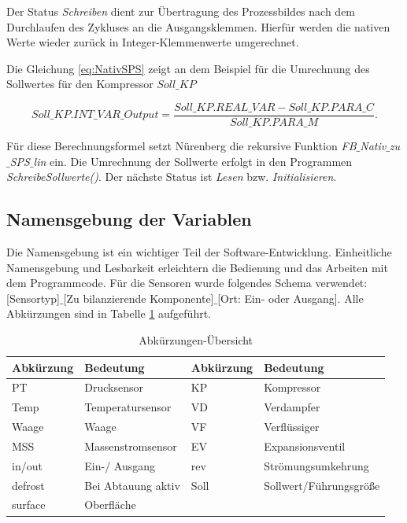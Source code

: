 Der Status \textit{Schreiben} dient zur Übertragung des Prozessbildes  nach dem Durchlaufen des Zykluses an die Ausgangsklemmen. Hierfür werden die nativen Werte wieder zurück in Integer-Klemmenwerte umgerechnet.

Die Gleichung \ref{eq:NativSPS} zeigt an dem Beispiel für die Umrechnung des Sollwertes für den Kompressor $Soll\_KP$

\begin{equation}
Soll\_KP.INT\_VAR\_Output = \frac{Soll\_KP.REAL\_VAR - Soll\_KP.PARA\_C}{Soll\_KP.PARA\_M}.
\label{eq:NativSPS} 
\end{equation}

Für diese Berechnungsformel setzt Nürenberg \citep{Nuerenberg2015} die rekursive Funktion \textit{FB$\_$Nativ$\_$zu$\_$SPS$\_$lin} ein. Die Umrechnung der Sollwerte erfolgt in den Programmen \textit{SchreibeSollwerte()}. Der nächste Status ist \textit{Lesen} bzw. \textit{Initialisieren}.

\subsection{Namensgebung der Variablen}
\label{subsec: Namensgebung}

Die Namensgebung ist ein wichtiger Teil der Software-Entwicklung. Einheitliche Namensgebung und Lesbarkeit erleichtern die Bedienung und das Arbeiten mit dem Programmcode. Für die Sensoren  wurde folgendes Schema verwendet: [Sensortyp]$\_$[Zu bilanzierende Komponente]$\_$[Ort: Ein- oder Ausgang]. Alle Abkürzungen sind in Tabelle \ref{tab:Abkürzungen} aufgeführt. 


\begin{table}[htb]
\centering
\caption{Abkürzungen-Übersicht}\vspace{6pt}
\begin{tabular}{llll}
\hline 
\rule[-1ex]{0pt}{2.5ex} \textbf{Abkürzung} & \textbf{Bedeutung} & \textbf{Abkürzung} & \textbf{Bedeutung} \\ 
\hline 
\hline
\rule[-1ex]{0pt}{2.5ex} PT & Drucksensor & KP & Kompressor \\ 
\hline 
\rule[-1ex]{0pt}{2.5ex} Temp & Temperatursensor & VD & Verdampfer \\ 
\hline 
\rule[-1ex]{0pt}{2.5ex} Waage & Waage & VF & Verflüssiger \\ 
\hline 
\rule[-1ex]{0pt}{2.5ex} MSS & Massenstromsensor & EV & Expansionsventil \\ 
\hline 
\rule[-1ex]{0pt}{2.5ex} in/out & Ein-/ Ausgang & rev &  Strömungsumkehrung \\ 
\hline 
\rule[-1ex]{0pt}{2.5ex} defrost & Bei Abtauung aktiv & Soll & Sollwert/Führungsgröße \\ 
\hline 
\rule[-1ex]{0pt}{2.5ex} surface & Oberfläche &  &  \\ 
\hline 
\hline
\end{tabular} 
\label{tab:Abkürzungen}
\end{table}

